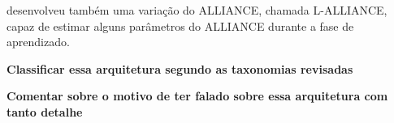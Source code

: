          desenvolveu também uma variação do ALLIANCE, chamada L-ALLIANCE, capaz de estimar alguns parâmetros do ALLIANCE durante a fase de aprendizado.
        
        \textbf{\color{red} Classificar essa arquitetura segundo as taxonomias revisadas}
        
        \textbf{\color{red} Comentar sobre o motivo de ter falado sobre essa arquitetura com tanto detalhe}
        
        